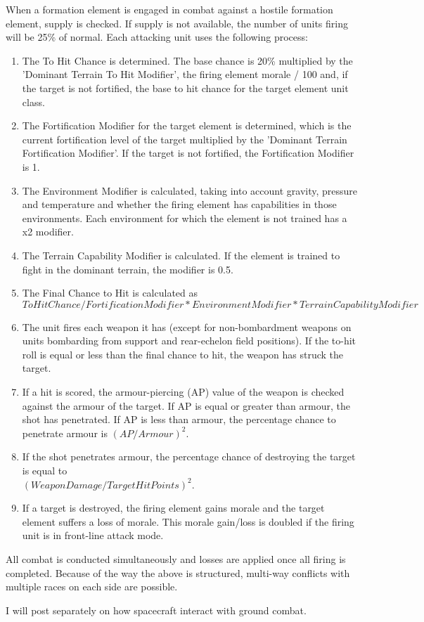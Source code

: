 \documentclass[../../Aurora C# unofficial manual.tex]{subfiles}
\begin{document}
	When a formation element is engaged in combat against a hostile formation element, supply is checked. If supply is not available, the number of units firing will be 25\% of normal. Each attacking unit uses the following process:
	\begin{enumerate}
		\item The To Hit Chance is determined. The base chance is 20\% multiplied by the 'Dominant Terrain To Hit Modifier', the firing element morale / 100 and, if the target is not fortified, the base to hit chance for the target element unit class.
		\item The Fortification Modifier for the target element is determined, which is the current fortification level of the target multiplied by the 'Dominant Terrain Fortification Modifier'. If the target is not fortified, the Fortification Modifier is 1.
		\item The Environment Modifier is calculated, taking into account gravity, pressure and temperature and whether the firing element has capabilities in those environments. Each environment for which the element is not trained has a x2 modifier.
		\item The Terrain Capability Modifier is calculated. If the element is trained to fight in the dominant terrain, the modifier is 0.5.
		\item The Final Chance to Hit is calculated as \( To Hit Chance / Fortification Modifier * Environment Modifier * Terrain Capability Modifier \)
		\item The unit fires each weapon it has (except for non-bombardment weapons on units bombarding from support and rear-echelon field positions). If the to-hit roll is equal or less than the final chance to hit, the weapon has struck the target.
		\item If a hit is scored, the armour-piercing (AP) value of the weapon is checked against the armour of the target. If AP is equal or greater than armour, the shot has penetrated. If AP is less than armour, the percentage chance to penetrate armour is \( (AP / Armour)^{2} \).
		\item If the shot penetrates armour, the percentage chance of destroying the target is equal to\\ \( (Weapon Damage / Target Hit Points)^{2} \).
		\item If a target is destroyed, the firing element gains morale and the target element suffers a loss of morale. This morale gain/loss is doubled if the firing unit is in front-line attack mode.
	\end{enumerate}

	All combat is conducted simultaneously and losses are applied once all firing is completed. Because of the way the above is structured, multi-way conflicts with multiple races on each side are possible.
	
	I will post separately on how spacecraft interact with ground combat.
\end{document}
